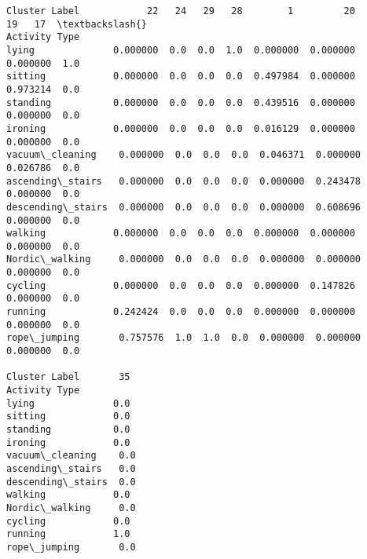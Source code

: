\documentclass[11pt]{article}
\begin{document}
\begin{tcolorbox}[breakable, size=fbox, boxrule=.5pt, pad at break*=1mm, opacityfill=0]
\begin{Verbatim}[commandchars=\\\{\}]
Cluster Label            22   24   29   28        1         20        19   17  \textbackslash{}
Activity Type
lying              0.000000  0.0  0.0  1.0  0.000000  0.000000  0.000000  1.0
sitting            0.000000  0.0  0.0  0.0  0.497984  0.000000  0.973214  0.0
standing           0.000000  0.0  0.0  0.0  0.439516  0.000000  0.000000  0.0
ironing            0.000000  0.0  0.0  0.0  0.016129  0.000000  0.000000  0.0
vacuum\_cleaning    0.000000  0.0  0.0  0.0  0.046371  0.000000  0.026786  0.0
ascending\_stairs   0.000000  0.0  0.0  0.0  0.000000  0.243478  0.000000  0.0
descending\_stairs  0.000000  0.0  0.0  0.0  0.000000  0.608696  0.000000  0.0
walking            0.000000  0.0  0.0  0.0  0.000000  0.000000  0.000000  0.0
Nordic\_walking     0.000000  0.0  0.0  0.0  0.000000  0.000000  0.000000  0.0
cycling            0.000000  0.0  0.0  0.0  0.000000  0.147826  0.000000  0.0
running            0.242424  0.0  0.0  0.0  0.000000  0.000000  0.000000  0.0
rope\_jumping       0.757576  1.0  1.0  0.0  0.000000  0.000000  0.000000  0.0

Cluster Label       35
Activity Type
lying              0.0
sitting            0.0
standing           0.0
ironing            0.0
vacuum\_cleaning    0.0
ascending\_stairs   0.0
descending\_stairs  0.0
walking            0.0
Nordic\_walking     0.0
cycling            0.0
running            1.0
rope\_jumping       0.0
\end{Verbatim}
\end{tcolorbox}
        
\end{document}
